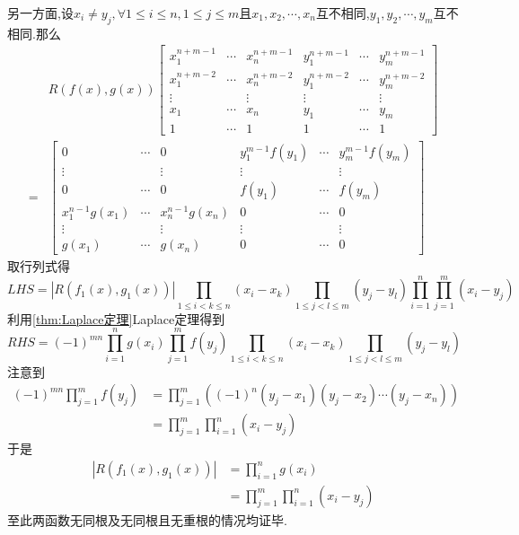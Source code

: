 \begin{formal}
\begin{Proof}
另一方面,设$x_i\neq y_j,\forall 1\leqslant i\leqslant n,1\leqslant j\leqslant m$且$x_1,x_2,\cdots,x_n$互不相同,$y_1,y_2,\cdots,y_m$互不相同.那么
\begin{align*}
    &R\left(f\left(x\right),g\left(x\right)\right)\begin{bmatrix}
        x_1^{n+m-1}&\cdots&x_n^{n+m-1}&y_1^{n+m-1}&\cdots&y_m^{n+m-1}\\
        x_1^{n+m-2}&\cdots&x_n^{n+m-2}&y_1^{n+m-2}&\cdots&y_m^{n+m-2}\\
        \vdots&&\vdots&\vdots&&\vdots\\
        x_1&\cdots&x_n&y_1&\cdots&y_m\\
        1&\cdots&1&1&\cdots&1
    \end{bmatrix}\\
    =&
    \begin{bmatrix}
        0&\cdots&0&y_1^{m-1}f\left(y_1\right)&\cdots&y_m^{m-1}f\left(y_m\right)\\
        \vdots&&\vdots&\vdots&&\vdots\\
        0&\cdots&0&f\left(y_1\right)&\cdots&f\left(y_m\right)\\
        x_1^{n-1}g\left(x_1\right)&\cdots&x_n^{n-1}g\left(x_n\right)&0&\cdots&0\\
        \vdots&&\vdots&\vdots&&\vdots\\
        g\left(x_1\right)&\cdots&g\left(x_n\right)&0&\cdots&0
    \end{bmatrix}
\end{align*}
取行列式得
\[
LHS = \left|
    R \left(
        f_1\left(x\right),g_1\left(x\right)    
    \right)
\right|\prod_{1\leqslant i<k\leqslant n}\left(
    x_i-x_k
\right)\prod_{1\leqslant j<l\leqslant m}\left(
    y_j-y_l 
\right)
\prod_{i=1}^{n}\prod_{j=1}^{m}\left(
    x_i-y_j
\right)
\]
利用\cref{thm:Laplace定理}\textup{Laplace}定理得到
\[
RHS=\left(-1\right)^{mn}\prod_{i=1}^{n}
g\left(x_i\right)\prod_{j=1}^{m}f\left(y_j\right)\prod_{1\leqslant i<k\leqslant n}\left(
    x_i-x_k
\right)\prod_{1\leqslant j<l\leqslant m}\left(
    y_j-y_l 
\right)
\]
注意到
\begin{align*}
    \left(-1\right)^{mn}\prod_{j=1}^{m}f\left(y_j\right)&=\prod_{j=1}^{m}\left(
        \left(-1\right)^n\left(y_j-x_1\right)\left(y_j-x_2\right)\cdots\left(y_j-x_n\right)
    \right)\\
    &=\prod_{j=1}^{m}\prod_{i=1}^{n}\left(
        x_i-y_j
    \right)
\end{align*}
于是
\begin{align*}
    \left|
    R\left(f_1\left(x\right),g_1\left(x\right)\right)
    \right|&=\prod_{i=1}^{n}g\left(x_i\right)\\
    &=
    \prod_{j=1}^{m}\prod_{i=1}^{n}\left(
        x_i-y_j
    \right)
\end{align*}至此两函数无同根及无同根且无重根的情况均证毕.


\end{Proof}
\end{formal}
